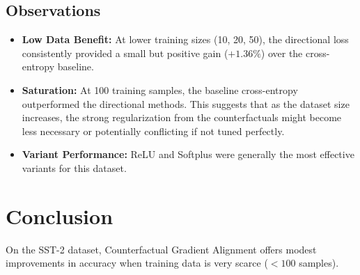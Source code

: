\documentclass{article}
\begin{document}
\subsection{Observations}
\begin{itemize}
    \item \textbf{Low Data Benefit:} At lower training sizes (10, 20, 50), the directional loss consistently provided a small but positive gain ($+1.36\%$) over the cross-entropy baseline.
    \item \textbf{Saturation:} At 100 training samples, the baseline cross-entropy outperformed the directional methods. This suggests that as the dataset size increases, the strong regularization from the counterfactuals might become less necessary or potentially conflicting if not tuned perfectly.
    \item \textbf{Variant Performance:} ReLU and Softplus were generally the most effective variants for this dataset.
\end{itemize}

\section{Conclusion}
On the SST-2 dataset, Counterfactual Gradient Alignment offers modest improvements in accuracy when training data is very scarce ($<100$ samples).
\end{document}

